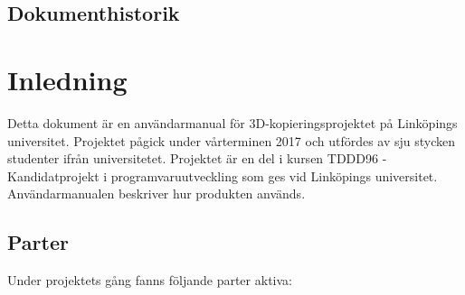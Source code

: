 \documentclass[a4paper,titlepage,12pt]{article}
\begin{document}
\begin{center}

\tableofcontents
\newpage

  \section*{\centering Dokumenthistorik}
  \renewcommand*{\arraystretch}{1.4}
 \centering
{}
\end{center}
\newpage

\section{Inledning}
	Detta dokument är en användarmanual för 3D-kopieringsprojektet på Linköpings universitet. Projektet pågick under vårterminen 2017 och utfördes av sju stycken studenter ifrån universitetet. Projektet är en del i kursen TDDD96 - Kandidatprojekt i programvaruutveckling som ges vid Linköpings universitet. Användarmanualen beskriver hur produkten används.
	\subsection{Parter}
		Under projektets gång fanns följande parter aktiva:
		
\end{document}
